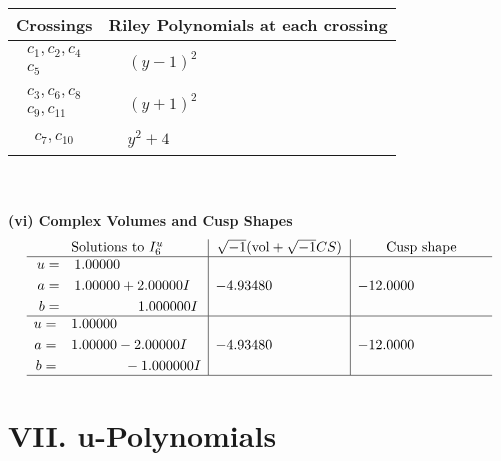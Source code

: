 \documentclass[1p]{elsarticle_modified}
\theoremstyle{definition}
\newcommand{\I}{\sqrt{-1}}
\begin{document}
\begin{tabular}{m{50pt}|m{274pt}}
Crossings & \hspace{64pt}Riley Polynomials at each crossing \\
\hline $$\begin{aligned}c_{1},c_{2},c_{4}\\c_{5}\end{aligned}$$&$\begin{aligned}
&(y-1)^2
\end{aligned}$\\
\hline $$\begin{aligned}c_{3},c_{6},c_{8}\\c_{9},c_{11}\end{aligned}$$&$\begin{aligned}
&(y+1)^2
\end{aligned}$\\
\hline $$\begin{aligned}c_{7},c_{10}\end{aligned}$$&$\begin{aligned}
&y^2+4
\end{aligned}$\\
\hline
\end{tabular}\\~\\
\newpage\flushleft \textbf{(vi) Complex Volumes and Cusp Shapes}
$$\begin{array}{c|c|c}  
\text{Solutions to }I^u_{6}& \I (\text{vol} + \sqrt{-1}CS) & \text{Cusp shape}\\
 \hline 
\begin{aligned}
u &= \phantom{-}1.00000\phantom{ +0.000000I} \\
a &= \phantom{-}1.00000 + 2.00000 I \\
b &= \phantom{-0.000000 -}1.000000 I\end{aligned}
 & -4.93480\phantom{ +0.000000I} & -12.0000\phantom{ +0.000000I} \\ \hline\begin{aligned}
u &= \phantom{-}1.00000\phantom{ +0.000000I} \\
a &= \phantom{-}1.00000 - 2.00000 I \\
b &= \phantom{-0.000000 } -1.000000 I\end{aligned}
 & -4.93480\phantom{ +0.000000I} & -12.0000\phantom{ +0.000000I}\\
 \hline 
 \end{array}$$\newpage
\newpage\renewcommand{\arraystretch}{1}
\centering \section*{ VII. u-Polynomials}
\end{document}
